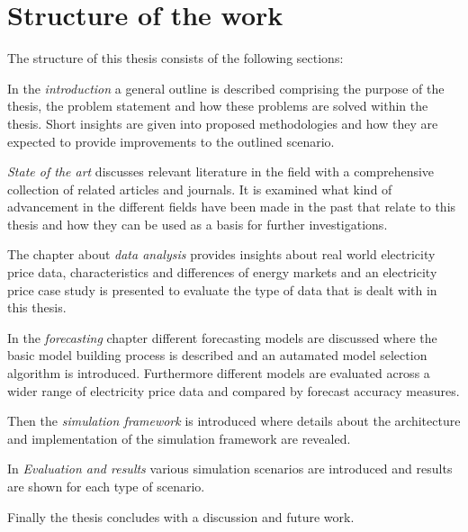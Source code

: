 \section{Structure of the work}

The structure of this thesis consists of the following sections: 

In the \textit{introduction} a general outline is described comprising the purpose of the thesis, the problem statement and how these problems are solved within the thesis. Short insights are given into proposed methodologies and how they are expected to provide improvements to the outlined scenario. 

\textit{State of the art} discusses relevant literature in the field with a comprehensive collection of related articles and journals. It is examined what kind of advancement in the different fields have been made in the past that relate to this thesis and how they can be used as a basis for further investigations. 

The chapter about \textit{data analysis} provides insights about real world electricity price data, characteristics and differences of energy markets and an electricity price case study is presented to evaluate the type of data that is dealt with in this thesis. 

In the \textit{forecasting} chapter different forecasting models are discussed where the basic model building process is described and an autamated model selection algorithm is introduced. Furthermore different models are evaluated across a wider range of electricity price data and compared by forecast accuracy measures. 

Then the \textit{simulation framework} is introduced where details about the architecture and implementation of the simulation framework are revealed. 

In \textit{Evaluation and results} various simulation scenarios are introduced and results are shown for each type of scenario. 

Finally the thesis concludes with a discussion and future work. 

